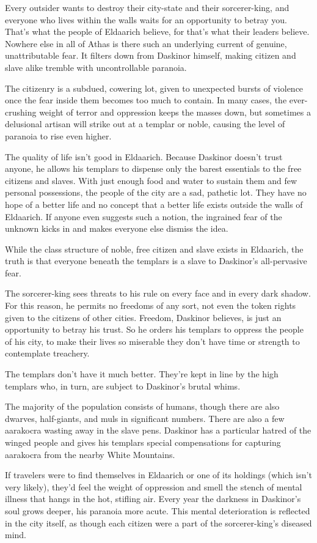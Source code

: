{
	Every outsider wants to destroy their city-state and their sorcerer-king, and everyone who lives within the walls waits for an opportunity to betray you. That's what the people of Eldaarich believe, for that's what their leaders believe. Nowhere else in all of Athas is there such an underlying current of genuine, unattributable fear. It filters down from Daskinor himself, making citizen and slave alike tremble with uncontrollable paranoia.

	The citizenry is a subdued, cowering lot, given to unexpected bursts of violence once the fear inside them becomes too much to contain. In many cases, the ever-crushing weight of terror and oppression keeps the masses down, but sometimes a delusional artisan will strike out at a templar or noble, causing the level of paranoia to rise even higher.

	The quality of life isn't good in Eldaarich. Because Daskinor doesn't trust anyone, he allows his templars to dispense only the barest essentials to the free citizens and slaves. With just enough food and water to sustain them and few personal possessions, the people of the city are a sad, pathetic lot. They have no hope of a better life and no concept that a better life exists outside the walls of Eldaarich. If anyone even suggests such a notion, the ingrained fear of the unknown kicks in and makes everyone else dismiss the idea.

	While the class structure of noble, free citizen and slave exists in Eldaarich, the truth is that everyone beneath the templars is a slave to Daskinor's all-pervasive fear.

	The sorcerer-king sees threats to his rule on every face and in every dark shadow. For this reason, he permits no freedoms of any sort, not even the token rights given to the citizens of other cities. Freedom, Daskinor believes, is just an opportunity to betray his trust. So he orders his templars to oppress the people of his city, to make their lives so miserable they don't have time or strength to contemplate treachery.

	The templars don't have it much better. They're kept in line by the high templars who, in turn, are subject to Daskinor's brutal whims.

	The majority of the population consists of humans, though there are also dwarves, half-giants, and muls in significant numbers. There are also a few aarakocra wasting away in the slave pens. Daskinor has a particular hatred of the winged people and gives his templars special compensations for capturing aarakocra from the nearby White Mountains.

	If travelers were to find themselves in Eldaarich or one of its holdings (which isn't very likely), they'd feel the weight of oppression and smell the stench of mental illness that hangs in the hot, stifling air. Every year the darkness in Daskinor's soul grows deeper, his paranoia more acute. This mental deterioration is reflected in the city itself, as though each citizen were a part of the sorcerer-king's diseased mind.
}
